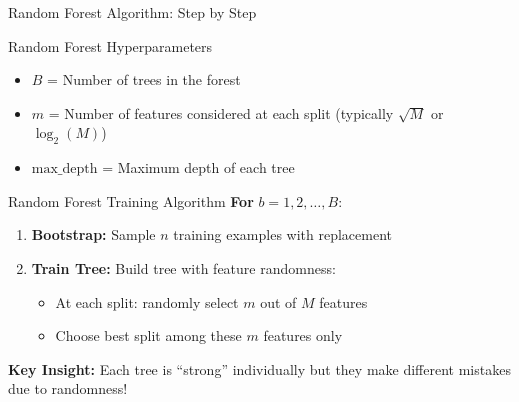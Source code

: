 \documentclass[8pt]{beamer}
\begin{document}
\begin{frame}{Random Forest Algorithm: Step by Step}
\begin{definitionbox}{Random Forest Hyperparameters}
\begin{itemize}
\item $B$ = Number of trees in the forest
\item $m$ = Number of features considered at each split (typically $\sqrt{M}$ or $\log_2(M)$)
\item $\text{max\_depth}$ = Maximum depth of each tree
\end{itemize}
\end{definitionbox}

\begin{alertbox}{Random Forest Training Algorithm}
\textbf{For } $b = 1, 2, \ldots, B$:
\begin{enumerate}
\item \textbf{Bootstrap:} Sample $n$ training examples with replacement
\item \textbf{Train Tree:} Build tree with feature randomness:
\begin{itemize}
\item At each split: randomly select $m$ out of $M$ features
\item Choose best split among these $m$ features only
\end{itemize}
\end{enumerate}
\end{alertbox}

\begin{keypointsbox}
\textbf{Key Insight:} Each tree is ``strong'' individually but they make different mistakes due to randomness!
\end{keypointsbox}
\end{frame}
\end{document}
